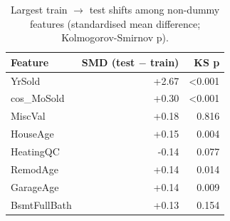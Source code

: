 \begin{table}[t]
\centering
\small
\begin{tabular}{lrr}
\toprule
Feature & SMD (test $-$ train) & KS p \\
\midrule
YrSold & +2.67 & <0.001 \\
cos\_MoSold & +0.30 & <0.001 \\
MiscVal & +0.18 & 0.816 \\
HouseAge & +0.15 & 0.004 \\
HeatingQC & -0.14 & 0.077 \\
RemodAge & +0.14 & 0.014 \\
GarageAge & +0.14 & 0.009 \\
BsmtFullBath & +0.13 & 0.154 \\
\bottomrule
\end{tabular}
\caption{Largest train $\rightarrow$ test shifts among non-dummy features (standardised mean difference; Kolmogorov-Smirnov p).}
\label{tab:eda_drift}
\end{table}
